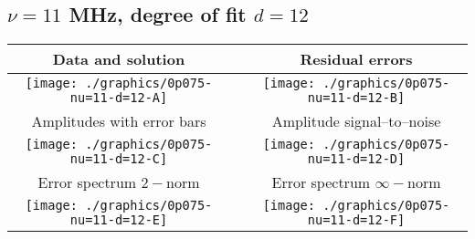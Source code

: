 

% 

\clearpage{}
\break{}

\subsection{$\nu = 11$ MHz, degree of fit $d = 12$}

\begin{table}[h]
    \begin{center}
        \begin{tabular}{ccc}
            Data and solution & \quad & Residual errors \\\hline
            \texttt{[image: ./graphics/0p075-nu=11-d=12-A]} &&
            \texttt{[image: ./graphics/0p075-nu=11-d=12-B]} \\[15pt]
            Amplitudes with error bars && Amplitude signal--to--noise \\\hline
            \texttt{[image: ./graphics/0p075-nu=11-d=12-C]} &&
            \texttt{[image: ./graphics/0p075-nu=11-d=12-D]} \\[15pt]
            Error spectrum $2-$norm && Error spectrum $\infty-$norm \\\hline
            \texttt{[image: ./graphics/0p075-nu=11-d=12-E]} &&
            \texttt{[image: ./graphics/0p075-nu=11-d=12-F]} \\[15pt]
        \end{tabular}
    \end{center}
\label{fig:elev=75, nu=11}
\end{table}



\endinput

